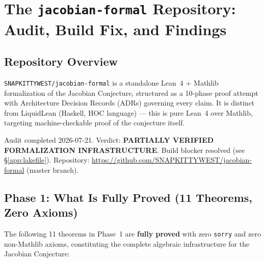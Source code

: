 \documentclass[12pt, letterpaper]{article}
\theoremstyle{plain}
\theoremstyle{definition}
\theoremstyle{remark}
\begin{document}
\section{The \texttt{jacobian-formal} Repository: Audit, Build Fix, and Findings}
\label{app:jacobian-formal}

\subsection{Repository Overview}

\texttt{SNAPKITTYWEST/jacobian-formal} is a standalone Lean~4 + Mathlib
formalization of the Jacobian Conjecture, structured as a 10-phase proof
attempt with Architecture Decision Records (ADRs) governing every claim.
It is distinct from LiquidLean (Haskell, HOC language) --- this is pure
Lean~4 over Mathlib, targeting machine-checkable proof of the conjecture itself.

\begin{wormbox}
Audit completed 2026-07-21. Verdict: \textbf{PARTIALLY VERIFIED FORMALIZATION
INFRASTRUCTURE}. Build blocker resolved (see \S\ref{app:lakefile}).
Repository: \url{https://github.com/SNAPKITTYWEST/jacobian-formal} (master branch).
\end{wormbox}

\subsection{Phase 1: What Is Fully Proved (11 Theorems, Zero Axioms)}

The following 11 theorems in Phase~1 are \textbf{fully proved} with zero
\texttt{sorry} and zero non-Mathlib axioms, constituting the complete
algebraic infrastructure for the Jacobian Conjecture:
\end{document}
